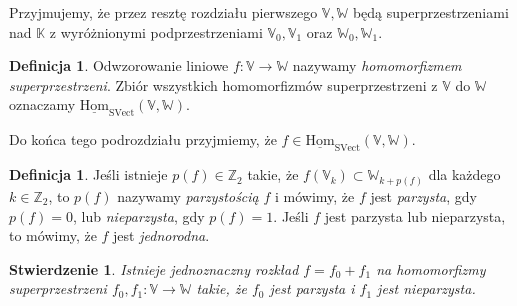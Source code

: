 \documentclass[11pt,a4paper]{report}
\newtheorem{proposition}[theorem]{Stwierdzenie}
\theoremstyle{definition}
\newtheorem{definition}[theorem]{Definicja}
\begin{document}
Przyjmujemy, że przez resztę rozdziału pierwszego $\mathbb{V},\mathbb{W}$ będą superprzestrzeniami nad $\mathbb{K}$ z wyróżnionymi podprzestrzeniami $\mathbb{V}_0, \mathbb{V}_1$ oraz $\mathbb{W}_{0}, \mathbb{W}_1$.

\begin{definition}
	Odwzorowanie liniowe $f: \mathbb{V} \rightarrow \mathbb{W}$ nazywamy \textit{homomorfizmem superprzestrzeni}. Zbiór wszystkich homomorfizmów superprzestrzeni z $\mathbb{V}$ do $\mathbb{W}$ oznaczamy $\underline{\mathrm{Hom}}_{\mathrm{SVect}}(\mathbb{V},\mathbb{W})$.
\end{definition}

Do końca tego podrozdziału przyjmiemy, że $f \in \underline{\mathrm{Hom}}_{\mathrm{SVect}}(\mathbb{V},\mathbb{W})$.

\begin{definition}
	Jeśli istnieje $p(f) \in \mathbb{Z}_2$ takie, że $f(\mathbb{V}_k) \subset \mathbb{W}_{k+p(f)}$ dla każdego $k \in \mathbb{Z}_2$, to $p(f)$ nazywamy \textit{parzystością} $f$ i mówimy, że $f$ jest \textit{parzysta}, gdy $p(f)=0$, lub \textit{nieparzysta}, gdy $p(f)=1$. Jeśli $f$ jest parzysta lub nieparzysta, to mówimy, że $f$ jest \textit{jednorodna}.
\end{definition}

\begin{proposition}
	\label{super_homomorphism_decomposition_proposition}
	Istnieje jednoznaczny rozkład $f = f_0 + f_1$ na homomorfizmy superprzestrzeni $f_0, f_1: \mathbb{V} \rightarrow \mathbb{W}$ takie, że $f_0$ jest parzysta i $f_1$ jest nieparzysta.
\end{proposition}
\end{document}
